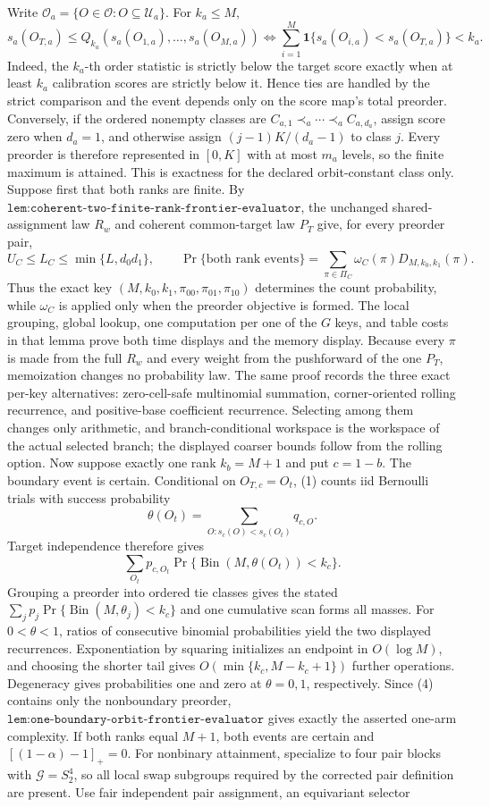 Write \(\mathcal O_a=\{O\in\mathcal O:O\subseteq\mathcal U_a\}\). For \(k_a\le M\), \[s_a(O_{T,a})\le Q_{k_a}(s_a(O_{1,a}),\ldots,s_a(O_{M,a}))\Longleftrightarrow\sum_{i=1}^M\mathbf 1\{s_a(O_{i,a})<s_a(O_{T,a})\}<k_a.\tag{1}\] Indeed, the \(k_a\)-th order statistic is strictly below the target score exactly when at least \(k_a\) calibration scores are strictly below it. Hence ties are handled by the strict comparison and the event depends only on the score map's total preorder. Conversely, if the ordered nonempty classes are \(C_{a,1}\prec_a\cdots\prec_a C_{a,d_a}\), assign score zero when \(d_a=1\), and otherwise assign \((j-1)K/(d_a-1)\) to class \(j\). Every preorder is therefore represented in \([0,K]\) with at most \(m_a\) levels, so the finite maximum is attained. This is exactness for the declared orbit-constant class only. Suppose first that both ranks are finite. By \(\texttt{lem:coherent-two-finite-rank-frontier-evaluator}\), the unchanged shared-assignment law \(R_w\) and coherent common-target law \(P_T\) give, for every preorder pair, \[U_C\le L_C\le\min\{L,d_0d_1\},\qquad \Pr\{\text{both rank events}\}=\sum_{\pi\in\Pi_C}\omega_C(\pi)D_{M,k_0,k_1}(\pi).\tag{2}\] Thus the exact key \((M,k_0,k_1,\pi_{00},\pi_{01},\pi_{10})\) determines the count probability, while \(\omega_C\) is applied only when the preorder objective is formed. The local grouping, global lookup, one computation per one of the \(G\) keys, and table costs in that lemma prove both time displays and the memory display. Because every \(\pi\) is made from the full \(R_w\) and every weight from the pushforward of the one \(P_T\), memoization changes no probability law. The same proof records the three exact per-key alternatives: zero-cell-safe multinomial summation, corner-oriented rolling recurrence, and positive-base coefficient recurrence. Selecting among them changes only arithmetic, and branch-conditional workspace is the workspace of the actual selected branch; the displayed coarser bounds follow from the rolling option. Now suppose exactly one rank \(k_b=M+1\) and put \(c=1-b\). The boundary event is certain. Conditional on \(O_{T,c}=O_t\), (1) counts iid Bernoulli trials with success probability \[\theta(O_t)=\sum_{O:s_c(O)<s_c(O_t)}q_{c,O}.\tag{3}\] Target independence therefore gives \[\sum_{O_t}p_{c,O_t}\Pr\{\operatorname{Bin}(M,\theta(O_t))<k_c\}.\tag{4}\] Grouping a preorder into ordered tie classes gives the stated \(\sum_jp_j\Pr\{\operatorname{Bin}(M,\theta_j)<k_c\}\) and one cumulative scan forms all masses. For \(0<\theta<1\), ratios of consecutive binomial probabilities yield the two displayed recurrences. Exponentiation by squaring initializes an endpoint in \(O(\log M)\), and choosing the shorter tail gives \(O(\min\{k_c,M-k_c+1\})\) further operations. Degeneracy gives probabilities one and zero at \(\theta=0,1\), respectively. Since (4) contains only the nonboundary preorder, \(\texttt{lem:one-boundary-orbit-frontier-evaluator}\) gives exactly the asserted one-arm complexity. If both ranks equal \(M+1\), both events are certain and \([(1-\alpha)-1]_+=0\). For nonbinary attainment, specialize to four pair blocks with \(\mathcal G=S_2^4\), so all local swap subgroups required by the corrected pair definition are present. Use fair independent pair assignment, an equivariant selector 